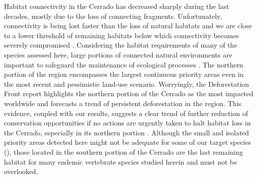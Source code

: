 \documentclass[12pt,openright,oneside,a4paper,english]{abntex2}
\begin{document}
Habitat connectivity in the Cerrado has decreased sharply during the last decades, mostly due to the loss of connecting fragments. Unfortunately, connectivity is being lost faster than the loss of natural habitats and we are close to a lower threshold of remaining habitats below which connectivity becomes severely compromised \citep{Grande2020}. Considering the habitat requirements of many of the species assessed here, large portions of connected natural environments are important to safeguard the maintenance of ecological processes \citep{Betts2017, Diaz2018}. The northern portion of the region encompasses the largest continuous priority areas even in the most recent and pessimistic land-use scenario. Worryingly, the Deforestation Front report \citep{Pacheco2021} highlights the northern portion of the Cerrado as the most impacted worldwide and forecasts a trend of persistent deforestation in the region. This evidence, coupled with our results, suggests a clear trend of further reduction of conservation opportunities if no actions are urgently taken to halt habitat loss in the Cerrado, especially in its northern portion \citep{Nori2013, Resende2019}. Although the small and isolated priority areas detected here might not be adequate for some of our target species (\citealp[see][]{deMarcoJr2020}), those located in the southern portion of the Cerrado are the last remaining habitat for many endemic vertebrate species studied herein and must not be overlooked.
\end{document}
